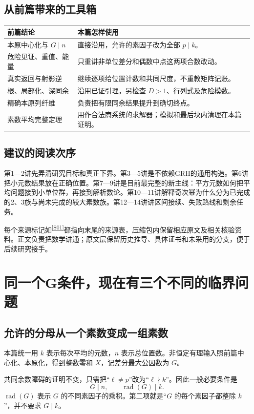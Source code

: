 \documentclass[11pt,a4paper,oneside,openany]{book}
\newcommand{\rad}{\operatorname{rad}}\newcommand{\diag}{\operatorname{diag}}
\newcommand{\src}[1]{\textsuperscript{\hyperref[source:#1]{[#1]}}}
\theoremstyle{definition}\newtheorem{example}[theorem]{例}\newtheorem{conjecture}[theorem]{猜想}
\numberwithin{equation}{chapter}\setcounter{tocdepth}{1}
\begin{document}
\section*{从前篇带来的工具箱}
\begin{longtable}{p{}p{}}
\toprule 前篇结论&本篇怎样使用\\\midrule
本原中心化与 $G\mid n$&直接沿用，允许的素因子改为全部 $p\mid k$。\\
危险见证、重值、能量&只重讲非单位差分和偶数中点这两项合数改动。\\
真实返回与射影逆&继续逐项给位置计数和共同尺度，不重教矩阵记账。\\
根、局部化、深同余&沿用已证引理，另检查 $D>1$、行列式及危险模数。\\
精确本原列纤维&负责把有限同余结果提升到确切终点。\\
素数平均完整定理&用作合法商系统的求解器；模拟和最后块内清理在本篇证明。\\\bottomrule
\end{longtable}

\section*{建议的阅读次序}
第1—2讲先弄清研究目标和真正下界。第3—5讲是不依赖GRH的通用构造。第6讲把小元数结果放在正确位置。第7—9讲是目前最完整的新主线：平方元数如何把平均问题接到小单位群，再接到解析数论。第10—11讲解释奇次幂为什么分为已完成的2、3族与尚未完成的较大素数族。第12—14讲讲区间接续、失败路线和剩余任务。

每个来源标记如\src{S01}都指向末尾的来源表，压缩包内保留相应原文及相关核验资料。正文负责把数学讲通；原文层保留历史推导、具体证书和未采用的分支，便于后续研究接手。

\tableofcontents\mainmatter


\chapter{同一个G条件，现在有三个不同的临界问题}\label{ch:targets}
\section{允许的分母从一个素数变成一组素数}
本篇统一用 $k$ 表示每次平均的元数，$n$ 表示总位置数。非恒定有理输入照前篇中心化、本原化，得到整数零和 $X$，记差分最大公因数为 $G$。

共同余数障碍的证明不变，只需把“$\ell\ne p$”改为“$\ell\nmid k$”。因此一般必要条件是
\begin{equation}\label{eq:G}
G\mid n,\qquad \rad(G)\mid k.
\end{equation}
$\rad(G)$ 表示 $G$ 的不同素因子的乘积。第二项就是“$G$ 的每个素因子都整除 $k$”，并不要求 $G\mid k$。
\end{document}
